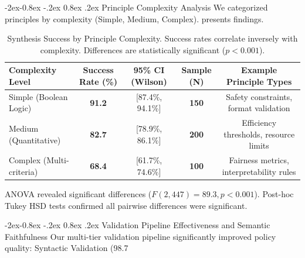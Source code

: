 \documentclass[manuscript,screen,review,anonymous,9pt]{acmart}
\makeatletter
\renewcommand\subsubsection{\@startsection{subsubsection}{3}{\z@}%
  {-2ex\@plus -0.8ex \@minus -.2ex}%
  {0.8ex \@plus .2ex}%
  {\normalfont\normalsize\bfseries}}
\newcommand{\tablesize}{\footnotesize}
\newcommand{\tablenumfmt}[1]{\textbf{#1}}
\newcommand{\tableheader}[1]{\textbf{#1}}
\makeatother
\begin{document}
\subsubsection{Principle Complexity Analysis}
We categorized principles by complexity (Simple, Medium, Complex).  presents findings.
\begin{table}[htbp]
\centering
\caption{Synthesis Success by Principle Complexity. Success rates correlate inversely with complexity. Differences are statistically significant ($p < 0.001$).}
\label{tab:complexity_analysis}
\tablesize
\begin{tabular}{@{}lcccc@{}}
\toprule
\tableheader{Complexity Level} & \tableheader{Success Rate (\%)} & \tableheader{95\% CI (Wilson)} & \tableheader{Sample (N)} & \tableheader{Example Principle Types} \\
\midrule
Simple (Boolean Logic)    & \tablenumfmt{91.2} & [87.4\%, 94.1\%] & \tablenumfmt{150} & Safety constraints, format validation \\
Medium (Quantitative)   & \tablenumfmt{82.7} & [78.9\%, 86.1\%] & \tablenumfmt{200} & Efficiency thresholds, resource limits \\
Complex (Multi-criteria) & \tablenumfmt{68.4} & [61.7\%, 74.6\%] & \tablenumfmt{100} & Fairness metrics, interpretability rules \\
\bottomrule
\end{tabular}
\end{table}
ANOVA revealed significant differences ($F(2,447) = 89.3, p < 0.001$). Post-hoc Tukey HSD tests confirmed all pairwise differences were significant.

\subsubsection{Validation Pipeline Effectiveness and Semantic Faithfulness}
Our multi-tier validation pipeline significantly improved policy quality: Syntactic Validation (98.7%
\end{document}
